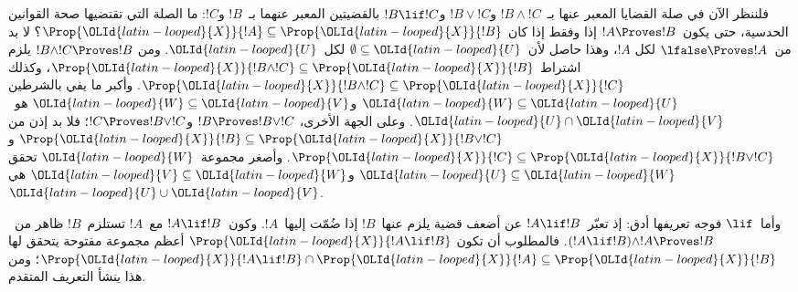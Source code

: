 \documentclass[../../../include/open-logic-section]{subfiles}
\begin{document}
فلننظر الآن في صلة القضايا المعبر عنها بـ~$!B \land !C$ و$!B \lor !C$
و$!B \lif !C$ بالقضيتين المعبر عنهما بـ~$!B$ و$!C$: ما الصلة التي
تقتضيها صحة القوانين الحدسية، حتى يكون~$!A \Proves !B$ إذا وفقط إذا كان
$\Prop{{\OLId{latin-looped}{X}}}{!A}\subseteq\Prop{{\OLId{latin-looped}{X}}}{!B}$؟ لا بد من~$\lfalse \Proves !A$ لكل
$!A$، وهذا حاصل لأن~$\emptyset\subseteq {\OLId{latin-looped}{U}}$ لكل~${\OLId{latin-looped}{U}}$. ومن
$!B \land !C \Proves !B$ يلزم اشتراط
$\Prop{{\OLId{latin-looped}{X}}}{!B \land !C}\subseteq\Prop{{\OLId{latin-looped}{X}}}{!B}$، وكذلك
$\Prop{{\OLId{latin-looped}{X}}}{!B \land !C}\subseteq\Prop{{\OLId{latin-looped}{X}}}{!C}$. وأكبر ما يفي بالشرطين
${\OLId{latin-looped}{W}} \subseteq {\OLId{latin-looped}{U}}$ و${\OLId{latin-looped}{W}} \subseteq {\OLId{latin-looped}{V}}$ هو~${\OLId{latin-looped}{U}} \cap {\OLId{latin-looped}{V}}$. وعلى الجهة الأخرى،
$!B \Proves !B \lor !C$ و$!C \Proves !B \lor !C$؛ فلا بد إذن من
$\Prop{{\OLId{latin-looped}{X}}}{!B}\subseteq\Prop{{\OLId{latin-looped}{X}}}{!B \lor !C}$ و
$\Prop{{\OLId{latin-looped}{X}}}{!C}\subseteq\Prop{{\OLId{latin-looped}{X}}}{!B \lor !C}$. وأصغر مجموعة~${\OLId{latin-looped}{W}}$ تحقق
${\OLId{latin-looped}{U}} \subseteq {\OLId{latin-looped}{W}}$ و${\OLId{latin-looped}{V}} \subseteq {\OLId{latin-looped}{W}}$ هي~${\OLId{latin-looped}{U}} \cup {\OLId{latin-looped}{V}}$.

وأما~$\lif$ فوجه تعريفها أدق: إذ تعبّر~$!A \lif !B$ عن أضعف قضية
يلزم عنها~$!B$ إذا ضُمّت إليها~$!A$. وكون~$!A \lif !B$ مع~$!A$
تستلزم~$!B$ ظاهر من~$(!A \lif !B)\land !A \Proves !B$. فالمطلوب أن تكون
$\Prop{{\OLId{latin-looped}{X}}}{!A \lif !B}$ أعظم مجموعة مفتوحة يتحقق لها
$\Prop{{\OLId{latin-looped}{X}}}{!A \lif !B}\cap\Prop{{\OLId{latin-looped}{X}}}{!A}\subseteq\Prop{{\OLId{latin-looped}{X}}}{!B}$؛ ومن هذا
ينشأ التعريف المتقدم.
\end{document}
